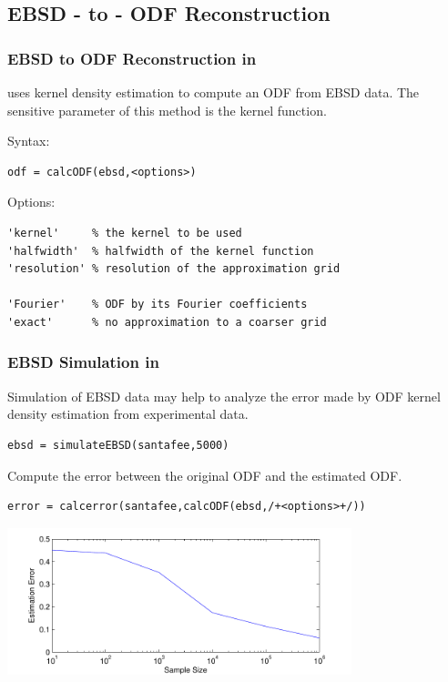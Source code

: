 \subsection*{EBSD - to - ODF Reconstruction}


\begin{frame}[fragile]
  \frametitle{EBSD to ODF Reconstruction in \MTEX}

  \mtex uses kernel density estimation to compute an ODF from EBSD data. The
  sensitive parameter of this method is the kernel function.

\medskip

  Syntax:
  \begin{alertenv}
\begin{lstlisting}
odf = calcODF(ebsd,<options>)
\end{lstlisting}
  \end{alertenv}

Options:
\begin{lstlisting}
'kernel'     % the kernel to be used
'halfwidth'  % halfwidth of the kernel function
'resolution' % resolution of the approximation grid

'Fourier'    % ODF by its Fourier coefficients
'exact'      % no approximation to a coarser grid
\end{lstlisting}


\end{frame}


\begin{frame}[fragile]
  \frametitle{EBSD Simulation in \mtex}

  Simulation of EBSD data may help to analyze the error made by ODF kernel
  density estimation from experimental data.

\begin{lstlisting}
ebsd = simulateEBSD(santafee,5000)
\end{lstlisting}

Compute the error between the original ODF and the estimated ODF.
\begin{lstlisting}
error = calcerror(santafee,calcODF(ebsd,/+<options>+/))
\end{lstlisting}

      \centerline{
      \includegraphics[width=10cm]{pic/ebsdcorrectness}}

\end{frame}






